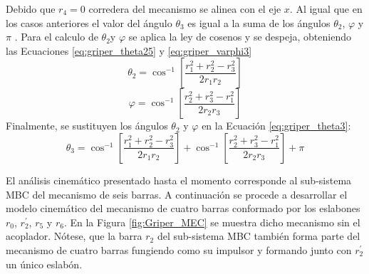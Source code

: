 \begin{enumerate}
Debido que $r_4 = 0$ corredera del mecanismo se alinea con el eje $x$. Al igual que en los casos anteriores el valor del ángulo $\theta_3$ es igual a la suma de los ángulos $\theta_2$, $\varphi$ y $\pi$ . Para el calculo de $\theta_2$y $\varphi$ se aplica la ley de cosenos y se despeja, obteniendo las Ecuaciones \ref{eq:griper_theta25} y \ref{eq:griper_varphi3}
\begin{equation}\label{eq:griper_theta25}
\theta_2=\cos^{-1}\left[ \frac{r^2_1 +r^2_2-r^2_3}{2r_1r_2}\right]
\end{equation}
\begin{equation}\label{eq:griper_varphi3}
\varphi=\cos^{-1}\left[ \frac{r^2_2 +r^2_3-r^2_1}{2r_2r_3}\right]
\end{equation}
Finalmente, se sustituyen los ángulos $\theta_2$ y $\varphi$  en la Ecuación \ref{eq:griper_theta3}:
\begin{equation}\label{eq:griper_theta33}
\theta_3=\cos^{-1}\left[ \frac{r^2_1 +r^2_2-r^2_3}{2r_1r_2}\right]+\cos^{-1}\left[ \frac{r^2_2 +r^2_3-r^2_1}{2r_2r_3}\right]+\pi
\end{equation}

\end{enumerate}
El análisis cinemático presentado hasta el momento corresponde al sub-sistema MBC del mecanismo de seis barras. A continuación se procede a  desarrollar el modelo cinemático del mecanismo de cuatro barras conformado por los eslabones $r_0$, $r^{\prime}_2$, $r_5$ y $r_6$. En la Figura \ref{fig:Griper_MEC} se muestra dicho mecanismo sin el acoplador. Nótese, que la barra $r_2$ del sub-sistema MBC también forma parte del mecanismo de cuatro barras fungiendo como su impulsor y formando junto con $r^{\prime}_2$ un único eslabón.

